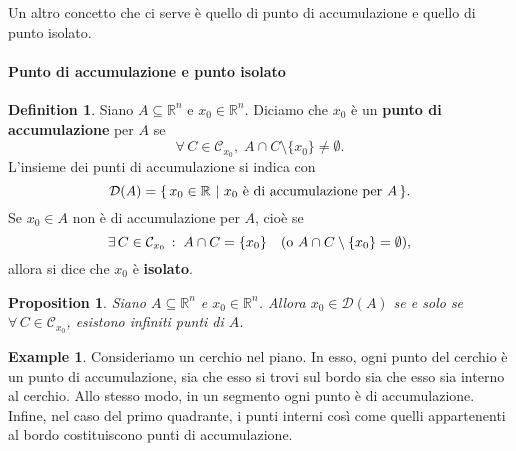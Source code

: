 \documentclass{article}
\theoremstyle{plain}
\newtheorem{prop}[thm]{Proposition}
\theoremstyle{definition}
\newtheorem{defn}{Definition}[section]
\newtheorem{exmp}{Example}[section]
\theoremstyle{remark}
\newcommand{\incfig}[2][\columnwidth]{%
    \def\svgwidth{#1}
    {#2.pdf_tex}
}
\begin{document}
\vspace{10pt}

Un altro concetto che ci serve è quello di punto di accumulazione e quello di punto isolato. 

\vspace{10pt}

\paragraph{Punto di accumulazione e punto isolato}
\begin{bxthm}
\begin{defn}
    Siano $A\subseteq\mathbb{R}^n$ e $x_0\in\mathbb{R}^n$. Diciamo che $x_0$ è un \textbf{punto di accumulazione} per $A$ se \[\forall\,C\in\mathcal{C}_{x_0},\;A\cap C\setminus\{x_0\}\neq\emptyset.\]
    L'insieme dei punti di accumulazione si indica con \[\mathcal{D}(A)=\{\,x_0\in\mathbb{R} \ | \ x_0 \textup{ è di accumulazione per }A\,\}.\]
    Se $x_0\in A$ non è di accumulazione per $A$, cioè se 
    \[\exists\,C\in\mathcal{C}_{x_0}\,:\;A\cap C=\{x_0\} \quad (\textup{o }A\cap C\setminus\{x_0\}=\emptyset), \]
    allora si dice che $x_0$ è \textbf{isolato}.
\end{defn}
\end{bxthm}

\vspace{10pt}

\begin{bxthm}
\begin{prop}
    Siano $A\subseteq\mathbb{R}^n$ e $x_0\in\mathbb{R}^n$.
    Allora $x_0\in\mathcal{D}(A)$ se e solo se $\forall\,C\in\mathcal{C}_{x_0}$, esistono infiniti punti di $A$.
\end{prop}
\end{bxthm}

\vspace{10pt}

\begin{exmp}
    Consideriamo un cerchio nel piano. In esso, ogni punto del cerchio è un punto di accumulazione, sia che esso si trovi sul bordo sia che esso sia interno al cerchio. 
    Allo stesso modo, in un segmento ogni punto è di accumulazione. 
    Infine, nel caso del primo quadrante, i punti interni così come quelli appartenenti al bordo costituiscono punti di accumulazione.
\end{exmp}
\end{document}
